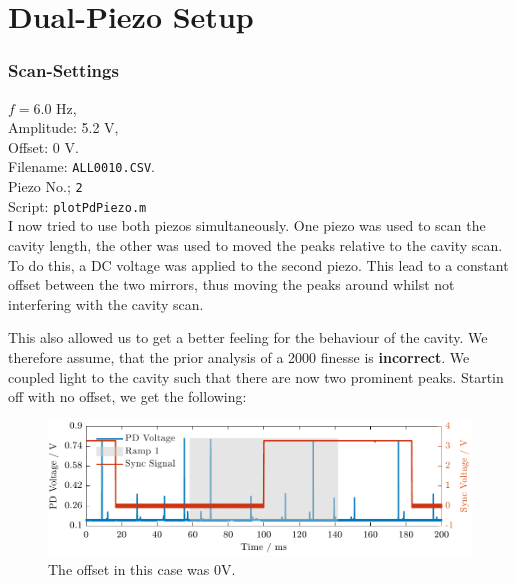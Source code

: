 \documentclass[a4paper,11pt]{article}
\begin{document}
\section{Dual-Piezo Setup}
\subsubsection*{Scan-Settings}
$f = 6.0$ Hz,  \\
Amplitude: 5.2 V,  \\
Offset: 0 V.  \\
Filename: \texttt{ALL0010.CSV}.   \\
Piezo No.; \texttt{2}  \\
Script: \texttt{plotPdPiezo.m} \\

I now tried to use both piezos simultaneously. One piezo was used to scan the cavity length, the other was used to moved the peaks relative to the cavity scan.
To do this, a DC voltage was applied to the second piezo. This lead to a constant offset between the two mirrors, thus moving the peaks around whilst not interfering with the cavity scan.

This also allowed us to get a better feeling for the behaviour of the cavity. 
We therefore assume, that the prior analysis of a 2000 finesse is \textbf{incorrect}.
We coupled light to the cavity such that there are now two prominent peaks.
Startin off with no offset, we get the following:


\begin{figure}[H]
    \centering
    \includegraphics[width=\textwidth]{twoPiezo/Figure_1.pdf}
    \caption{The offset in this case was 0V.}
\end{figure}
\end{document}
